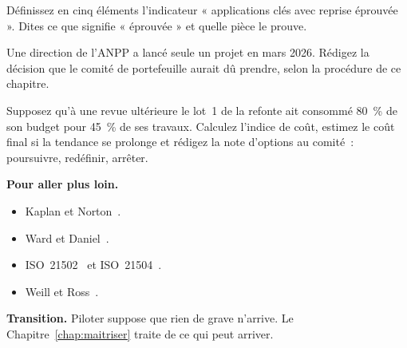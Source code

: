 \begin{boxexo}[title={\ding{45}\quad Exercice~13.2. Un indicateur \niveaumoyen}]
Définissez en cinq éléments l'indicateur « applications clés avec reprise éprouvée ». Dites ce que signifie « éprouvée » et quelle pièce le prouve.
\end{boxexo}

\begin{boxexo}[title={\ding{45}\quad Exercice~13.3. Le projet de mars \niveaumoyen}]
Une direction de l'ANPP a lancé seule un projet en mars 2026. Rédigez la décision que le comité de portefeuille aurait dû prendre, selon la procédure de ce chapitre.
\end{boxexo}

\begin{boxexo}[title={\ding{45}\quad Exercice~13.4. Arrêter \niveauexpert}]
Supposez qu'à une revue ultérieure le lot~1 de la refonte ait consommé 80~\% de son budget pour 45~\% de ses travaux. Calculez l'indice de coût, estimez le coût final si la tendance se prolonge et rédigez la note d'options au comité~: poursuivre, redéfinir, arrêter.
\end{boxexo}

\bigskip

\begin{boxinfo}
\textbf{Pour aller plus loin.}
\begin{itemize}
    \item Kaplan et Norton~\cite{kaplannorton1992}.
    \item Ward et Daniel~\cite{warddaniel2006}.
    \item ISO~21502~\cite{iso21502} et ISO~21504~\cite{iso21504}.
    \item Weill et Ross~\cite{weillross2004}.
\end{itemize}
\end{boxinfo}

\begin{boxinfo}
\textbf{Transition.} Piloter suppose que rien de grave n'arrive. Le Chapitre~\ref{chap:maitriser} traite de ce qui peut arriver.
\end{boxinfo}
